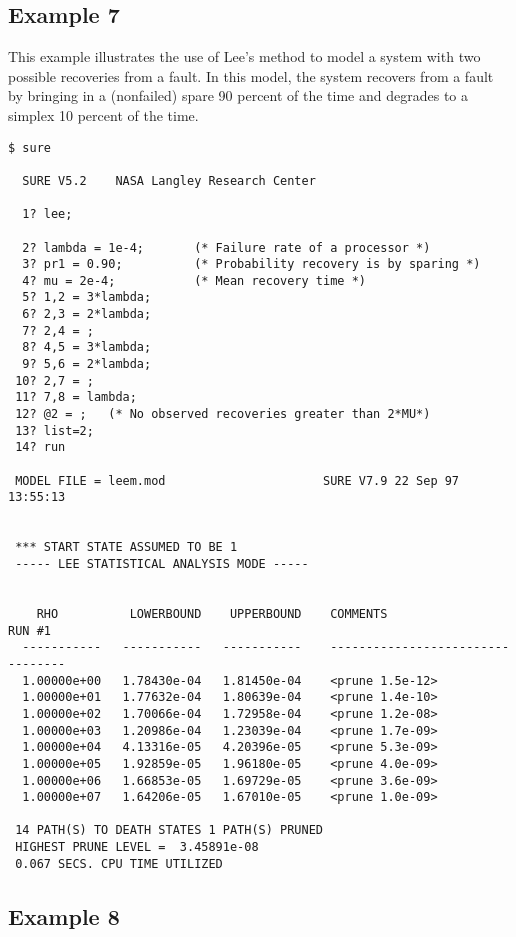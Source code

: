 \subsection{Example 7 }

This example illustrates the use of Lee's method to model a system with two
possible recoveries from a fault.  In this model, the system recovers from a
fault by bringing in a (nonfailed) spare 90 percent of the time and degrades
to a simplex 10 percent of the time.
\begin{verbatim}
$ sure

  SURE V5.2    NASA Langley Research Center

  1? lee;

  2? lambda = 1e-4;       (* Failure rate of a processor *)
  3? pr1 = 0.90;          (* Probability recovery is by sparing *)
  4? mu = 2e-4;           (* Mean recovery time *)
  5? 1,2 = 3*lambda;
  6? 2,3 = 2*lambda;
  7? 2,4 = ;
  8? 4,5 = 3*lambda;
  9? 5,6 = 2*lambda;
 10? 2,7 = ;
 11? 7,8 = lambda;
 12? @2 = ;   (* No observed recoveries greater than 2*MU*)
 13? list=2;
 14? run

 MODEL FILE = leem.mod                      SURE V7.9 22 Sep 97  13:55:13


 *** START STATE ASSUMED TO BE 1
 ----- LEE STATISTICAL ANALYSIS MODE -----

 
    RHO          LOWERBOUND    UPPERBOUND    COMMENTS                 RUN #1
  -----------   -----------   -----------    ---------------------------------
  1.00000e+00   1.78430e-04   1.81450e-04    <prune 1.5e-12>
  1.00000e+01   1.77632e-04   1.80639e-04    <prune 1.4e-10>
  1.00000e+02   1.70066e-04   1.72958e-04    <prune 1.2e-08>
  1.00000e+03   1.20986e-04   1.23039e-04    <prune 1.7e-09>
  1.00000e+04   4.13316e-05   4.20396e-05    <prune 5.3e-09>
  1.00000e+05   1.92859e-05   1.96180e-05    <prune 4.0e-09>
  1.00000e+06   1.66853e-05   1.69729e-05    <prune 3.6e-09>
  1.00000e+07   1.64206e-05   1.67010e-05    <prune 1.0e-09>

 14 PATH(S) TO DEATH STATES 1 PATH(S) PRUNED
 HIGHEST PRUNE LEVEL =  3.45891e-08
 0.067 SECS. CPU TIME UTILIZED
\end{verbatim}

\subsection{Example 8 }

